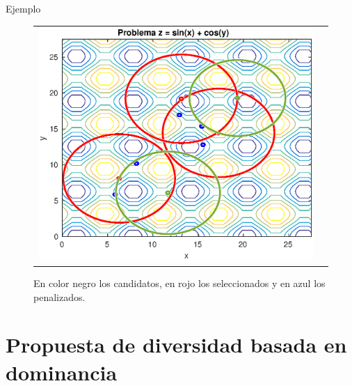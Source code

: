 \documentclass{beamer}
\begin{document}
\begin{frame}{Ejemplo}
\begin{figure}[H]
  \centering
  \begin{tabular}{c c}
   \includegraphics[scale=0.6]{Images/6.eps} 
  \end{tabular}
  \caption{\scriptsize En color negro los candidatos, en rojo los seleccionados y en azul los penalizados.}
\end{figure}
\end{frame}




\section{Propuesta de diversidad basada en dominancia}
\end{document}
